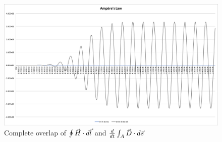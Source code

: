 \begin{figure}[tbph]
\centering
\includegraphics[width=0.95\linewidth]{graphics/ampere}
\caption{Complete overlap of $\oint \vec{H} \cdot d\vec{l}$ and ${d \over dt} \int_A \vec{D} \cdot d\vec{s}$}
\label{fig:ampere}
\end{figure}



